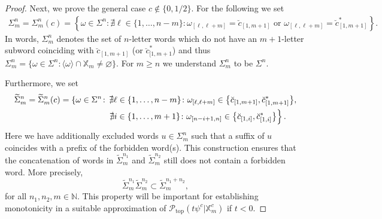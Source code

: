 \documentclass[11pt,reqno]{amsart}
\theoremstyle{plain}
\theoremstyle{definition}
\newcommand{\N}{{\mathbb N}}
\newcommand{\X}{{\mathbb X}}
\begin{document}
\begin{proof}
Next, we prove the general case $c\notin\{0,1/2\}$. For the following we set 
\begin{align}
 \Sigma_{m}^{n} =\Sigma_m^n(c)=\left\{\omega\in\Sigma^n\colon \nexists\ell\in \{1,\ldots, n-m\}\colon \omega_{[\ell,\ell+m]}=\breve{c}_{[1,m+1]}\text{ or }\omega_{[\ell,\ell+m]}=\breve{c}^{\ast}_{[1,m+1]}\right\}.\label{eq: def Sigma nm}
\end{align}
In words, $\Sigma_{m}^{n}$ denotes the set of $n$-letter words which do not have an $m+1$-letter subword coinciding with $\breve{c}_{[1,m+1]}$ (or $\breve{c}_{[1,m+1}^{\ast}$) and thus $\Sigma_{m}^{n}=\{\omega\in\Sigma^n\colon \langle\omega\rangle \cap \X_m\neq \varnothing\}$. For $m\geqslant n$ we understand $\Sigma_m^n$ to be $\Sigma^n$.

Furthermore, we set 
\begin{align*}
 \widetilde{\Sigma}_{m}^{n}
 =\widetilde{\Sigma}_{m}^{n}(c) =\left\{\omega\in\Sigma^n\colon \right.&\nexists\ell\in \{1,\ldots, n-m\}\colon \omega_{[\ell, \ell+m]}\in \big\{\breve{c}_{[1,m+1]},\breve{c}^{\ast}_{[1,m+1]}\big\},\\
 & \hspace{-0.8mm}\left.\nexists i\in \{1, \ldots, m+1 \} \colon \omega_{[n-i+1,n]}\in \big\{\breve{c}_{[1,i]},\breve{c}^{\ast}_{[1,i]}\big\}
 \right\}.
\end{align*}
Here we have additionally excluded words $u \in \Sigma^n_m$ such that a suffix of $u$ coincides with a prefix of the forbidden word(s). This construction ensures that the concatenation of words in $\widetilde \Sigma^{n_1}_m$ and $\widetilde \Sigma^{n_2}_m$ still does not contain a forbidden word. More precisely, 
\begin{equation}
\label{EQ:concat}
\widetilde \Sigma^{n_1}_m \widetilde \Sigma^{n_2}_m \subset \widetilde \Sigma^{n_1 + n_2}_m,
\end{equation}
for all $n_1, n_2 ,m \in \N$. This property will be important for establishing monotonicity in a suitable approximation of $\mathcal{P}_{\operatorname{top}}(t \psi^c \vert \mathbb{X}_m^{c})$ if $t < 0$. 




\end{proof}
\end{document}
